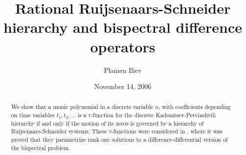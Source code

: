 \documentclass[11pt,reqno]{amsart}
\theoremstyle{definition}
\numberwithin{equation}{section}
\begin{document}
\title[Ruijsenaars-Schneider hierarchy and bispectral 
operators]{Rational Ruijsenaars-Schneider hierarchy and bispectral 
difference operators}

\author{Plamen Iliev}
\address{School of Mathematics, Georgia Institute of Technology, 
Atlanta, GA 30332--0160, USA}

\date{November 14, 2006}


\newcommand{\seref}[1]{Section \ref{#1}}
\newcommand{\thref}[1]{Theorem \ref{#1}}
\newcommand{\leref}[1]{Lemma \ref{#1}}
\newcommand{\prref}[1]{Proposition \ref{#1}}
\newcommand{\exref}[1]{Example \ref{#1}}

\newcommand{\cC}{{\mathcal C}}
\newcommand{\cA}{{\mathcal A}}
\newcommand{\cB}{{\mathcal B}}
\newcommand{\cL}{{\mathcal L}}

\newcommand{\De}{\Delta}

\newcommand{\C}{\mathbb C}
\newcommand{\Z}{\mathbb Z}
\newcommand{\N}{\mathbb N}
\newcommand{\tr}{\mathrm{tr}}
\newcommand{\diag}{\mathrm{diag}}
\newcommand{\Spec}{\mathrm{Spec}}
\newcommand{\rank}{\mathrm{rank}}
\newcommand{\Grad}{\mathrm{Gr}^{\mathrm{ad}}}

\newcommand{\pd}{\partial}
\newcommand{\Mh}{{\hat{M}}}
\newcommand{\Yh}{{\hat{Y}}}

\newcommand{\Xt}{{\tilde{X}}}
\newcommand{\Yt}{{\tilde{Y}}}
\newcommand{\xt}{{\tilde{x}}}
\newcommand{\yt}{{\tilde{y}}}
\newcommand{\taut}{{\tilde{\tau}}}

\newcommand{\expp}{\exp\left(\sum_{i=1}^{\infty}t_iz^i\right)}
\newcommand{\expm}{\exp\left(-\sum_{i=1}^{\infty}t_iz^i \right)}
\newcommand{\Expp}{{\mathrm{Exp}}(n;t,z)}
\newcommand{\Expm}{{\mathrm{Exp}}^{-1}(n;t,z)}

\newcommand{\vw}{{\vec{w}}}
\newcommand{\ve}{{\vec{e}}}


\begin{abstract} 
We show that a monic polynomial in a discrete variable $n$, with coefficients 
depending on time variables $t_1, t_2,\dots$ is a $\tau$-function 
for the discrete Kadomtsev-Petviashvili hierarchy if and only if the motion 
of its zeros is governed by a hierarchy of Ruijsenaars-Schneider 
systems. These $\tau$-functions were considered in \cite{HI}, where it was 
proved that they parametrize rank one solutions to a 
difference-differential version of the bispectral problem.
\end{abstract}
\end{document}
